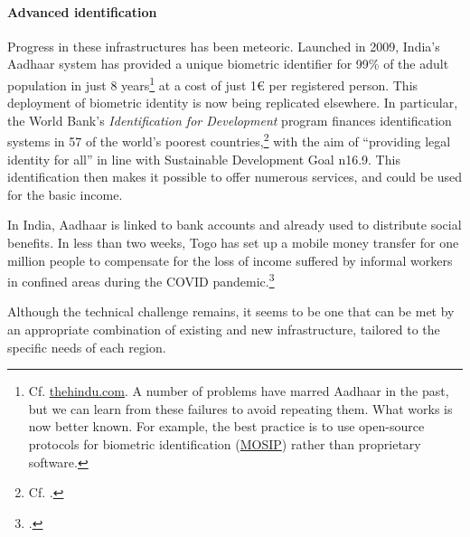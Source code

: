 \documentclass[a5paper,english,openany]{memoir}
\begin{document}
\paragraph{Advanced identification}
Progress in these infrastructures has been meteoric. Launched in 2009, India's Aadhaar system has provided a unique biometric identifier for 99\% of the adult population in just 8 years\footnote{Cf. \href{https://www.thehindu.com/business/Aadhaar-covers-99-of-adults-in-India-Prasad/article17104609.ece}{thehindu.com}. 
A number of problems have marred Aadhaar in the past, but we can learn from these failures to avoid repeating them. What works is now better known. For example, the best practice is to use open-source protocols for biometric identification (\href{https://mosip.io}{MOSIP}) rather than proprietary software.} at a cost of just 1\euro{} per registered person. This deployment of biometric identity is now being replicated elsewhere. %
In particular, the World Bank's \textit{Identification for Development} program finances identification systems in 57 of the world's poorest countries,\footnote{Cf. \cite{world_bank_state_2017,world_bank_benin_2020,world_bank_identification_2022}.} with the aim of ``providing legal identity for all'' in line with Sustainable Development Goal n\textdegree{}16.9. This identification then makes it possible to offer numerous services, and could be used for the basic income. 

In India, Aadhaar is linked to bank accounts and already used to distribute social benefits. In less than two weeks, Togo has set up a mobile money transfer for one million people to compensate for the loss of income suffered by informal workers in confined areas during the COVID pandemic.\footnote{\citet{ipa_togos_2021}.} 

Although the technical challenge remains, it seems to be one that can be met by an appropriate combination of existing and new infrastructure, tailored to the specific needs of each region. 
\end{document}
